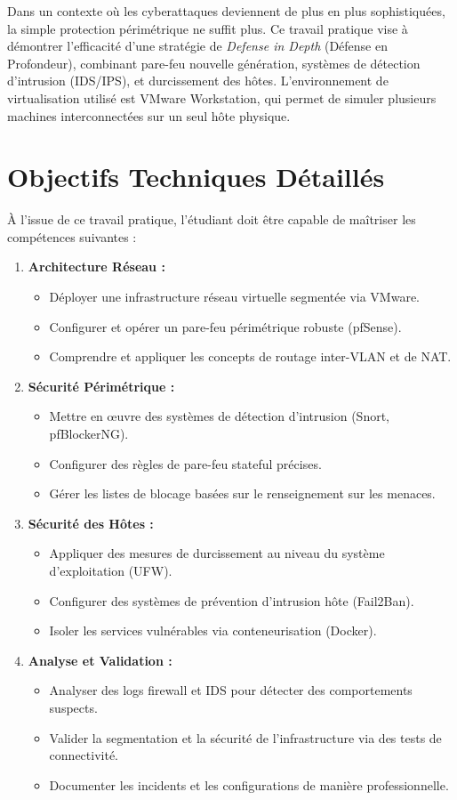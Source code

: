 \documentclass[12pt,a4paper,openany]{report}
\begin{document}
	Dans un contexte où les cyberattaques deviennent de plus en plus sophistiquées, la simple protection périmétrique ne suffit plus. Ce travail pratique vise à démontrer l'efficacité d'une stratégie de \textit{Defense in Depth} (Défense en Profondeur), combinant pare-feu nouvelle génération, systèmes de détection d'intrusion (IDS/IPS), et durcissement des hôtes. L'environnement de virtualisation utilisé est VMware Workstation, qui permet de simuler plusieurs machines interconnectées sur un seul hôte physique.
	
	\section{Objectifs Techniques Détaillés}
	À l'issue de ce travail pratique, l'étudiant doit être capable de maîtriser les compétences suivantes :
	
	\begin{enumerate}[leftmargin=*]
		\item \textbf{Architecture Réseau :}
		\begin{itemize}
			\item Déployer une infrastructure réseau virtuelle segmentée via VMware.
			\item Configurer et opérer un pare-feu périmétrique robuste (pfSense).
			\item Comprendre et appliquer les concepts de routage inter-VLAN et de NAT.
		\end{itemize}
		\item \textbf{Sécurité Périmétrique :}
		\begin{itemize}
			\item Mettre en œuvre des systèmes de détection d'intrusion (Snort, pfBlockerNG).
			\item Configurer des règles de pare-feu stateful précises.
			\item Gérer les listes de blocage basées sur le renseignement sur les menaces.
		\end{itemize}
		\item \textbf{Sécurité des Hôtes :}
		\begin{itemize}
			\item Appliquer des mesures de durcissement au niveau du système d'exploitation (UFW).
			\item Configurer des systèmes de prévention d'intrusion hôte (Fail2Ban).
			\item Isoler les services vulnérables via conteneurisation (Docker).
		\end{itemize}
		\item \textbf{Analyse et Validation :}
		\begin{itemize}
			\item Analyser des logs firewall et IDS pour détecter des comportements suspects.
			\item Valider la segmentation et la sécurité de l'infrastructure via des tests de connectivité.
			\item Documenter les incidents et les configurations de manière professionnelle.
		\end{itemize}
	\end{enumerate}
	
\end{document}
